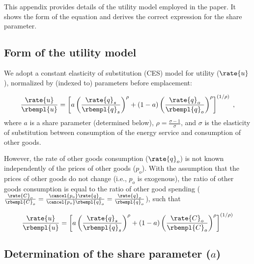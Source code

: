 
This appendix provides details of the utility model employed in the paper.
It shows the form of the equation and derives the correct expression for the share parameter.


\subsection{Form of the utility model}
\label{sec:utility_model_form}

We adopt a constant elasticity of substitution (CES) model for utility ($\rate{u}$),
normalized by (indexed to) parameters before emplacement:

\begin{equation}
  \frac{\rate{u}}{\rbempl{u}} = 
  \left[ a \left( \frac{\rate{q}_s}{\rbempl{q}_s} \right)^\rho 
        + (1-a) \left( \frac{\rate{q}_o}{\rbempl{q}_o} \right)^\rho  \right]^{(1/\rho)} \; ,
\end{equation}
%
where $a$ is a share parameter (determined below),
$\rho = \frac{\sigma - 1}{\sigma}$, and 
$\sigma$ is the elasticity of substitution between
consumption of the energy service and 
consumption of other goods.

However, the rate of other goods consumption ($\rate{q}_o$)
is not known independently of the prices of other goods ($p_o$).
With the assumption that the prices of other goods do not change
(i.e., $p_o$ is exogenous), 
the ratio of other goods consumption is equal to the ratio of other good spending
($\frac{\rate{C}_o}{\rbempl{C}_o} = \frac{\cancel{p_o} \rate{q}_o}{\cancel{p_o} \rbempl{q}_o} =
\frac{\rate{q}_o}{\rbempl{q}_o}$), such that

\begin{equation} \label{eq:ces_utility_with_a}
  \frac{\rate{u}}{\rbempl{u}} = 
  \left[ a \left( \frac{\rate{q}_s}{\rbempl{q}_s} \right)^\rho 
        + (1-a) \left( \frac{\rate{C}_o}{\rbempl{C}_o} \right)^\rho  \right]^{(1/\rho)}
\end{equation}


\subsection{Determination of the share parameter ($a$)}
\label{sec:share_parameter_derivation}

